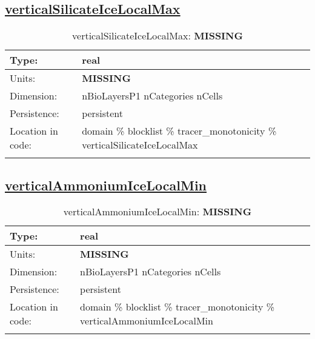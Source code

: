 \subsection[verticalSilicateIceLocalMax]{\hyperref[sec:var_tab_tracer_monotonicity]{verticalSilicateIceLocalMax}}
\label{subsec:var_sec_tracer_monotonicity_verticalSilicateIceLocalMax}
\begin{center}
\begin{longtable}{| p{2.0in} | p{4.0in} |}
        \hline 
        Type: & real \\
        \hline 
        Units: & {\bf \color{red} MISSING} \\
        \hline 
        Dimension: & nBioLayersP1 nCategories nCells \\
        \hline 
        Persistence: & persistent \\
        \hline 
         Location in code: & domain \% blocklist \% tracer\_monotonicity \% verticalSilicateIceLocalMax \\
         \hline 
    \caption{verticalSilicateIceLocalMax: {\bf \color{red} MISSING}}
\end{longtable}
\end{center}
\subsection[verticalAmmoniumIceLocalMin]{\hyperref[sec:var_tab_tracer_monotonicity]{verticalAmmoniumIceLocalMin}}
\label{subsec:var_sec_tracer_monotonicity_verticalAmmoniumIceLocalMin}
\begin{center}
\begin{longtable}{| p{2.0in} | p{4.0in} |}
        \hline 
        Type: & real \\
        \hline 
        Units: & {\bf \color{red} MISSING} \\
        \hline 
        Dimension: & nBioLayersP1 nCategories nCells \\
        \hline 
        Persistence: & persistent \\
        \hline 
         Location in code: & domain \% blocklist \% tracer\_monotonicity \% verticalAmmoniumIceLocalMin \\
         \hline 
    \caption{verticalAmmoniumIceLocalMin: {\bf \color{red} MISSING}}
\end{longtable}
\end{center}
